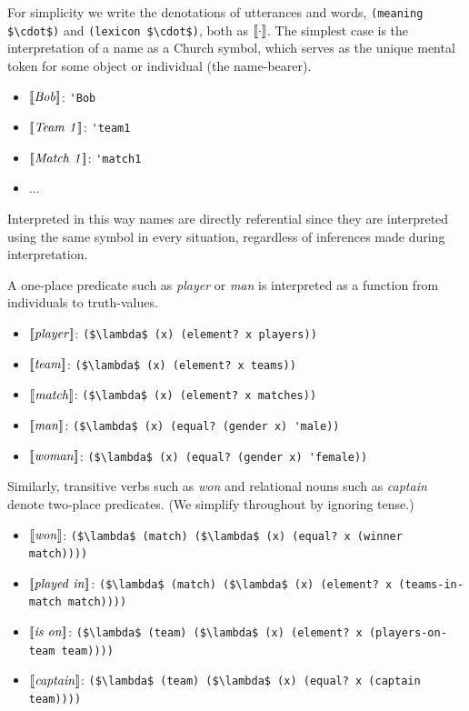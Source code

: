 \documentclass[pdfextras]{handbook}
\newcommand{\llbracket}{\ensuremath{\left [\!\left [}}%
\newcommand{\rrbracket}{\ensuremath{\right ]\!\right ]}}
\providecommand{\sv}[1]{\ensuremath{\llbracket \mathit{#1} \rrbracket}}
\newcommand{\denot}[1]{\ensuremath{\llbracket \mathit{#1} \rrbracket}}
\begin{document}
For simplicity we write the denotations of utterances and words, \lstinline[mathescape]{(meaning $\cdot$)} and \lstinline[mathescape]{(lexicon $\cdot$)}, both as \denot{\cdot}.
The simplest case is the interpretation of a name as a Church symbol, which serves as the unique mental token for some object or individual (the name-bearer).
\begin{itemize}
\item \sv{Bob}: \lstinline{'Bob} 
\item \sv{Team\ 1}: \lstinline{'team1} 
\item \sv{Match\ 1}: \lstinline{'match1}
\item ...
\end{itemize}
Interpreted in this way names are directly referential since they are interpreted using the same symbol in every situation, regardless of inferences made during interpretation. 

A one-place predicate such as \emph{player} or \emph{man} is interpreted as a function from individuals to truth-values. 
\begin{itemize}
\item  \sv{player}: \lstinline[mathescape]{($\lambda$ (x) (element? x players))}
\item \sv{team}: \lstinline[mathescape]{($\lambda$ (x) (element? x teams))}
\item \sv{match}: \lstinline[mathescape]{($\lambda$ (x) (element? x matches))}
\item \sv{man}: \lstinline[mathescape]{($\lambda$ (x) (equal? (gender x) 'male))}
\item \sv{woman}: \lstinline[mathescape]{($\lambda$ (x) (equal? (gender x) 'female))}
\end{itemize}
Similarly, transitive verbs such as \emph{won} and relational nouns such as \emph{captain} denote two-place predicates. (We simplify throughout by ignoring tense.)
\begin{itemize}
\item  \sv{won}: \lstinline[mathescape]{($\lambda$ (match) ($\lambda$ (x) (equal? x (winner match))))}
\item \sv{played\ in}:  \lstinline[mathescape]{($\lambda$ (match) ($\lambda$ (x) (element? x (teams-in-match match))))}
\item \sv{is\ on}:  \lstinline[mathescape]{($\lambda$ (team) ($\lambda$ (x) (element? x (players-on-team team))))}
\item \sv{captain}: \lstinline[mathescape]{($\lambda$ (team) ($\lambda$ (x) (equal? x (captain team))))}
\end{itemize}
\end{document}
